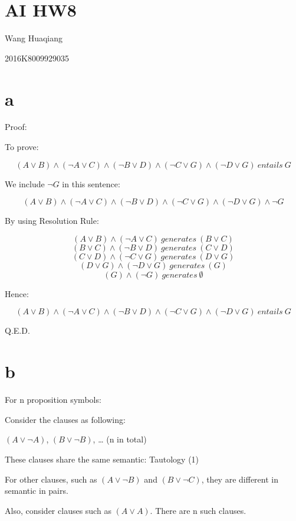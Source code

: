 \hypertarget{ai-hw8}{%
\section{AI HW8}\label{ai-hw8}}

Wang Huaqiang

2016K8009929035

\hypertarget{a}{%
\section{a}\label{a}}

Proof:

To prove:

\[(A \vee B ) \wedge (\neg A \vee C) \wedge (\neg B \vee D) \wedge (\neg C \vee G ) \wedge (\neg D \vee G) \ entails \  G\]

We include \(\neg G\) in this sentence:

\[(A \vee B ) \wedge (\neg A \vee C) \wedge (\neg B \vee D) \wedge (\neg C \vee G ) \wedge (\neg D \vee G) \wedge \neg G\]

By using Resolution Rule:

\[(A \vee B ) \wedge (\neg A \vee C) \ generates \ (B \vee C) \]
\[(B \vee C) \wedge (\neg B \vee D) \ generates \ (C \vee D) \]
\[(C \vee D) \wedge (\neg C \vee G) \ generates \ (D \vee G) \]
\[(D \vee G) \wedge (\neg D \vee G) \ generates \ (G) \]
\[(G) \wedge (\neg G) \ generates \ \emptyset  \]

Hence:

\[(A \vee B ) \wedge (\neg A \vee C) \wedge (\neg B \vee D) \wedge (\neg C \vee G ) \wedge (\neg D \vee G) \ entails \  G\]

Q.E.D.

\hypertarget{b}{%
\section{b}\label{b}}

For n proposition symbols:

Consider the clauses as following:

\((A \vee \neg A)\), \((B \vee \neg B)\), \ldots{} (n in total)

These clauses share the same semantic: Tautology (1)

For other clauses, such as \((A \vee \neg B)\) and \((B \vee \neg C)\),
they are different in semantic in pairs.

Also, consider clauses such as \((A \vee A)\). There are n such clauses.

